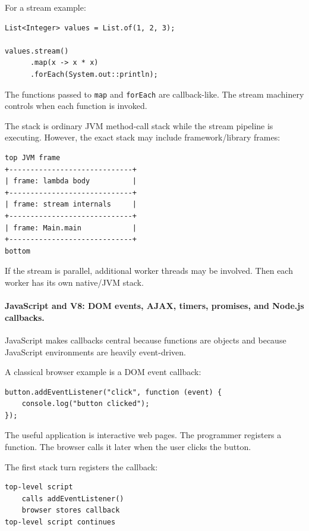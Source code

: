 \documentclass[a4paper,twoside]{report}
\begin{document}
For a stream example:

\begin{verbatim}
List<Integer> values = List.of(1, 2, 3);

values.stream()
      .map(x -> x * x)
      .forEach(System.out::println);
\end{verbatim}

The functions passed to \texttt{map} and \texttt{forEach} are callback-like. The stream machinery controls when each function is invoked.

The stack is ordinary JVM method-call stack while the stream pipeline is executing. However, the exact stack may include framework/library frames:

\begin{verbatim}
top JVM frame
+-----------------------------+
| frame: lambda body          |
+-----------------------------+
| frame: stream internals     |
+-----------------------------+
| frame: Main.main            |
+-----------------------------+
bottom
\end{verbatim}

If the stream is parallel, additional worker threads may be involved. Then each worker has its own native/JVM stack.

\paragraph{JavaScript and V8: DOM events, AJAX, timers, promises, and Node.js callbacks.}

JavaScript makes callbacks central because functions are objects and because JavaScript environments are heavily event-driven.

A classical browser example is a DOM event callback:

\begin{verbatim}
button.addEventListener("click", function (event) {
    console.log("button clicked");
});
\end{verbatim}

The useful application is interactive web pages. The programmer registers a function. The browser calls it later when the user clicks the button.

The first stack turn registers the callback:

\begin{verbatim}
top-level script
    calls addEventListener()
    browser stores callback
top-level script continues
\end{verbatim}
\end{document}
